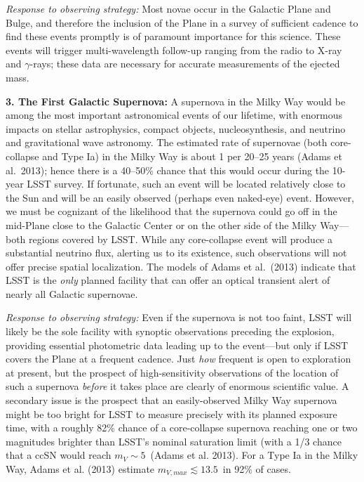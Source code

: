 {\it Response to observing strategy:} Most novae occur in the Galactic
Plane and Bulge, and therefore the inclusion of the Plane in a survey
of sufficient cadence to find these events promptly is of paramount
importance for this science. These events will trigger
multi-wavelength follow-up ranging from the radio to X-ray and
$\gamma$-rays; these data are necessary for accurate measurements of
the ejected mass.

{\bf 3. The First Galactic Supernova:} A supernova in the Milky Way
would be among the most important astronomical events of our lifetime,
with enormous impacts on stellar astrophysics, compact objects,
nucleosynthesis, and neutrino and gravitational wave astronomy. The
estimated rate of supernovae (both core-collapse and Type Ia) in the
Milky Way is about 1 per 20--25 years (Adams et al.~2013); hence there
is a 40--50\% chance that this would occur during the 10-year LSST
survey. If fortunate, such an event will be located relatively close
to the Sun and will be an easily observed (perhaps even naked-eye)
event. However, we must be cognizant of the likelihood that the
supernova could go off in the mid-Plane close to the Galactic Center
or on the other side of the Milky Way---both regions covered by
LSST. While any core-collapse event will produce a substantial
neutrino flux, alerting us to its existence, such observations will
not offer precise spatial localization. The models of Adams et
al.~(2013) indicate that LSST is the \emph{only} planned facility that
can offer an optical transient alert of nearly all Galactic
supernovae. 

{\it Response to observing strategy:} Even if the supernova is not too
faint, LSST will likely be the sole facility with synoptic
observations preceding the explosion, providing essential photometric
data leading up to the event---but only if LSST covers the Plane at a
frequent cadence. Just {\it how} frequent is open to exploration at
present, but the prospect of high-sensitivity observations of the
location of such a supernova {\it before} it takes place are clearly
of enormous scientific value. A secondary issue is the prospect that
an easily-observed Milky Way supernova might be too bright for LSST to
measure precisely with its planned exposure time, with a roughly 82\%
chance of a core-collapse supernova reaching one or two magnitudes
brighter than LSST's nominal saturation limit (with a 1/3 chance that
a ccSN would reach $m_V \sim 5$~(Adams et al. 2013). For a Type Ia in
the Milky Way, Adams et al. (2013) estimate $m_{V, max} \lesssim
13.5$~in 92\% of cases.

